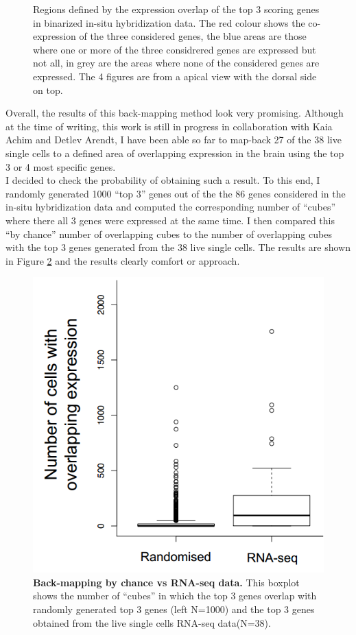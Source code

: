 \begin{figure}[H]
        \caption{Regions defined by the expression overlap of the top 3 scoring genes in \cite{Tomer10} binarized in-situ hybridization data. The red colour shows the co-expression of the three considered genes, the blue areas are those where one or more of the three considrered genes are expressed but not all, in grey are the areas where none of the considered genes are expressed. The 4 figures are from a apical view with the dorsal side on top.}\label{fig:cell_localization}
\end{figure}

Overall, the results of this back-mapping method look very promising. Although at the time of writing, this work is still in progress in collaboration with Kaia Achim and Detlev Arendt, I have been able so far to map-back 27 of the 38 live single cells to a defined area of overlapping expression in the brain using the top 3 or 4 most specific genes.\\

I decided to check the probability of obtaining such a result. To this end, I randomly generated 1000 ``top 3'' genes out of the the 86 genes considered in the in-situ hybridization data and computed the corresponding number of ``cubes'' where there all 3 genes were expressed at the same time. I then compared this ``by chance'' number of overlapping cubes to the number of overlapping cubes with the top 3 genes generated from the 38 live single cells. The results are shown in Figure \ref{fig:boxplot_rna} and the results clearly comfort or approach.

	\begin{figure}[H]
\centerline{\includegraphics[width=0.6\linewidth]{gfx/chapter2/rand_top3.png}}
\caption{{\bf Back-mapping by chance vs RNA-seq data.} This boxplot shows the number of ``cubes'' in which the top 3 genes overlap with randomly generated top 3 genes (left N=1000) and the top 3 genes obtained from the live single cells RNA-seq data(N=38).}\label{fig:boxplot_rna}
	\end{figure}
	
